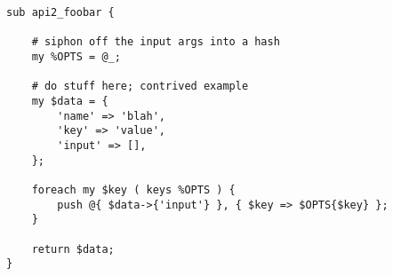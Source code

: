 \begin{verbatim}
sub api2_foobar {

    # siphon off the input args into a hash
    my %OPTS = @_;

    # do stuff here; contrived example
    my $data = {
        'name' => 'blah',
        'key' => 'value',
        'input' => [],
    };

    foreach my $key ( keys %OPTS ) {
        push @{ $data->{'input'} }, { $key => $OPTS{$key} };
    }

    return $data;
}
\end{verbatim}

